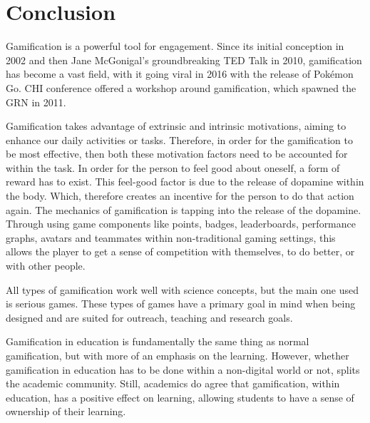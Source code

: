 \chapter{Conclusion}
\label{chap:conclusion}



	Gamification is a powerful tool for engagement. Since its initial conception in 2002 and then Jane McGonigal's groundbreaking TED Talk in 2010, gamification has become a vast field, with it going viral in 2016 with the release of Pokémon Go. CHI conference offered a workshop around gamification, which spawned the \ac{GRN} in 2011. 
	
	Gamification takes advantage of extrinsic and intrinsic motivations, aiming to enhance our daily activities or tasks. Therefore, in order for the gamification to be most effective, then both these motivation factors need to be accounted for within the task. In order for the person to feel good about oneself, a form of reward has to exist. This feel-good factor is due to the release of dopamine within the body. Which, therefore creates an incentive for the person to do that action again. The mechanics of gamification is tapping into the release of the dopamine. Through using game components like points, badges, leaderboards, performance graphs, avatars and teammates within non-traditional gaming settings, this allows the player to get a sense of competition with themselves, to do better, or with other people.  
	
	All types of gamification work well with science concepts, but the main one used is serious games. These types of games have a primary goal in mind when being designed and are suited for outreach, teaching and research goals.
	
	Gamification in education is fundamentally the same thing as normal gamification, but with more of an emphasis on the learning. However, whether gamification in education has to be done within a non-digital world or not, splits the academic community. Still, academics do agree that gamification, within education, has a positive effect on learning, allowing students to have a sense of ownership of their learning.
	
